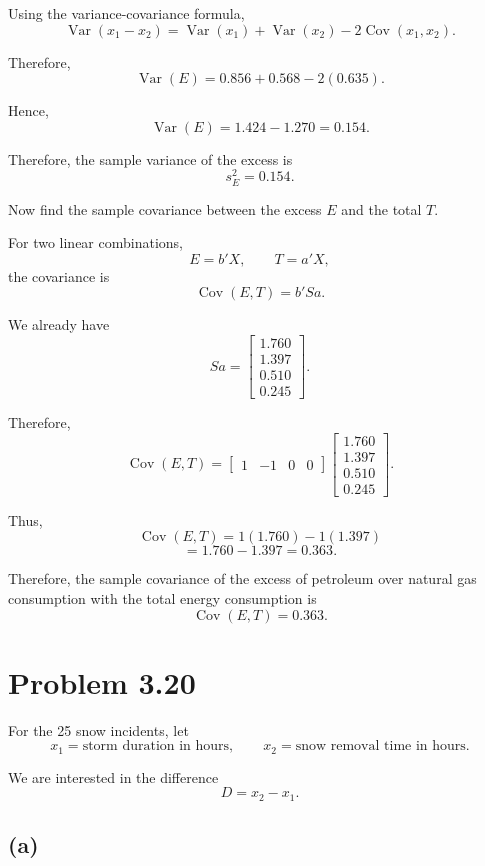 \documentclass[12pt]{article}
\begin{document}
	Using the variance-covariance formula,
	\[
	\operatorname{Var}(x_1-x_2)
	=
	\operatorname{Var}(x_1)
	+
	\operatorname{Var}(x_2)
	-
	2\operatorname{Cov}(x_1,x_2).
	\]
	
	Therefore,
	\[
	\operatorname{Var}(E)
	=
	0.856+0.568-2(0.635).
	\]
	
	Hence,
	\[
	\operatorname{Var}(E)
	=
	1.424-1.270
	=
	\boxed{0.154}.
	\]
	
	Therefore, the sample variance of the excess is
	\[
	\boxed{s_E^2=0.154}.
	\]
	
	Now find the sample covariance between the excess \(E\)
	and the total \(T\).
	
	For two linear combinations,
	\[
	E=b'X,
	\qquad
	T=a'X,
	\]
	the covariance is
	\[
	\operatorname{Cov}(E,T)=b'Sa.
	\]
	
	We already have
	\[
	Sa
	=
	\begin{bmatrix}
		1.760\\
		1.397\\
		0.510\\
		0.245
	\end{bmatrix}.
	\]
	
	Therefore,
	\[
	\operatorname{Cov}(E,T)
	=
	\begin{bmatrix}
		1&-1&0&0
	\end{bmatrix}
	\begin{bmatrix}
		1.760\\
		1.397\\
		0.510\\
		0.245
	\end{bmatrix}.
	\]
	
	Thus,
	\[
	\operatorname{Cov}(E,T)
	=
	1(1.760)-1(1.397)
	\]
	\[
	=
	1.760-1.397
	=
	\boxed{0.363}.
	\]
	
	Therefore, the sample covariance of the excess of petroleum
	over natural gas consumption with the total energy consumption
	is
	\[
	\boxed{\operatorname{Cov}(E,T)=0.363}.
	\]
	
	\section*{Problem 3.20}
	
	For the 25 snow incidents, let
	\[
	x_1=\text{storm duration in hours},
	\qquad
	x_2=\text{snow removal time in hours}.
	\]
	
	We are interested in the difference
	\[
	D=x_2-x_1.
	\]
	
	\subsection*{(a)}
	
\end{document}
